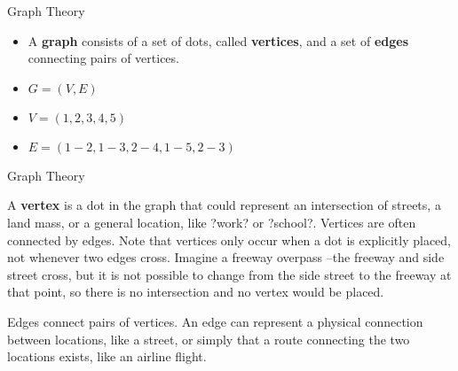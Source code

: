    \begin{frame}[fragile]{Graph Theory}

    \begin{itemize}
        \item A \textbf{graph} consists of a set of dots, called \textbf{vertices}, and a set of \textbf{edges} connecting pairs of vertices.  
        \item $G = (V,E)$
        \item $V = (1,2,3,4,5)$
        \item $E= (1-2,1-3,2-4,1-5,2-3)$
    \end{itemize}
\end{frame}

   \begin{frame}[fragile]{Graph Theory}

\begin{definition}[Vertex]
A \textbf{vertex} is a dot in the graph that 
could represent an intersection of streets, a land 
mass, or a general location, like ?work? or ?school?.  Vertices are often connected by edges.  Note that vertices only occur when a dot is explicitly placed, not whenever two edges cross.  Imagine a freeway overpass --the freeway and side street cross, but it is not possible to change from the side street to the freeway at that point, so there is no intersection and no vertex would be placed.
\end{definition}

\begin{definition}[Edges]
Edges connect pairs of vertices.  An edge can represent a physical connection between 
locations, like a street, or simply that a route connecting the two locations exists, like 
an airline flight.
\end{definition}




\end{frame}

